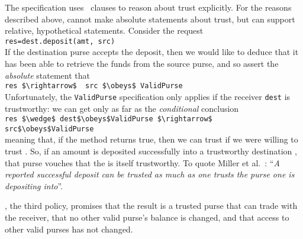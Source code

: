 The  specification
uses \obeys\ clauses to reason
about trust explicitly.  For the reasons described above,
 cannot make absolute statements about trust, but can
support relative, hypothetical statements.
%
Consider the request\\ %
%
\SP  \lstinline+res=dest.deposit(amt, src)+\\
%
If the destination purse accepts the deposit, then   %
we would like to deduce that it has been   able to retrieve the funds
from the source purse,
and so assert the {\em absolute} statement that \\
%
\SP   \lstinline+res $\rightarrow$  src $\obeys$ ValidPurse+\\
%
Unfortunately, the \lstinline+ValidPurse+ specification %
only
applies if the receiver \lstinline+dest+ is trustworthy: we can get
only as far as the %
{\em conditional} conclusion\\
%
\SP  \lstinline+res $\wedge$ dest$\obeys$ValidPurse $\rightarrow$ src$\obeys$ValidPurse+\\
%
meaning that, if the  method returns true, then we can
trust  if we were willing to trust .
\noindent So, if an amount is deposited successfully into a
trustworthy destination , that purse vouches that the
 is itself trustworthy.
To quote Miller et al.~\cite{ELang}:
``\textit{A reported successful deposit can be trusted as much as one
  trusts the purse one is depositing into}''.


, the third policy, promises that the result is a
trusted purse that can trade with the receiver, that no other valid
purse's balance is changed, and that access to other valid purses has
not changed.


